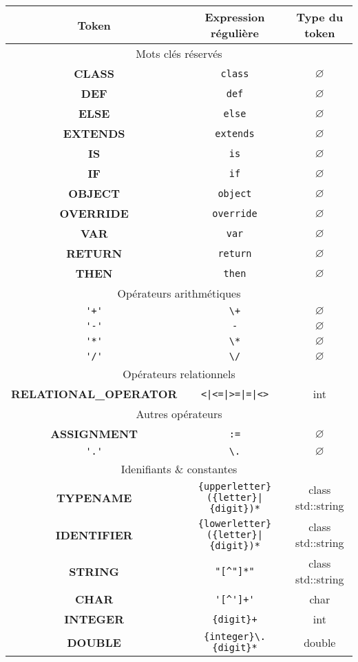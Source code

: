\documentclass[12pt,a4paper]{article}
\begin{document}
\begin{center}
	\sffamily
	\begin{tabular}{|c|c|c|}
		\hline
		Token & Expression régulière & Type du token \tabularnewline
		\hline \hline
		\multicolumn{3}{|c|}{Mots clés réservés} \tabularnewline		
		\hline
		\textbf{CLASS}    & \verb|class|    & $\varnothing$ \tabularnewline
		\hline
		\textbf{DEF}      & \verb|def|      & $\varnothing$ \tabularnewline
		\hline
		\textbf{ELSE}     &  \verb|else|    & $\varnothing$ \tabularnewline
		\hline
		\textbf{EXTENDS}  & \verb|extends|  & $\varnothing$ \tabularnewline
		\hline
		\textbf{IS}       & \verb|is|       & $\varnothing$ \tabularnewline
		\hline
		\textbf{IF}       & \verb|if|       & $\varnothing$ \tabularnewline
		\hline
		\textbf{OBJECT}   & \verb|object|   & $\varnothing$ \tabularnewline
		\hline
		\textbf{OVERRIDE} & \verb|override| & $\varnothing$ \tabularnewline
		\hline
		\textbf{VAR}      & \verb|var|      & $\varnothing$ \tabularnewline
		\hline
		\textbf{RETURN}   & \verb|return|   & $\varnothing$ \tabularnewline
		\hline
		\textbf{THEN}     & \verb|then|     & $\varnothing$ \tabularnewline
		\hline \hline
		\multicolumn{3}{|c|}{Opérateurs arithmétiques} \tabularnewline
		\hline
		\verb|'+'| & \verb|\+| & $\varnothing$ \tabularnewline
		\verb|'-'| & \verb|-|  & $\varnothing$ \tabularnewline
		\verb|'*'| & \verb|\*| & $\varnothing$ \tabularnewline
		\verb|'/'| & \verb|\/| & $\varnothing$ \tabularnewline
		\hline \hline
		\multicolumn{3}{|c|}{Opérateurs relationnels} \tabularnewline
		\hline
		\textbf{RELATIONAL\_OPERATOR} & \verb!<|<=|>=|=|<>! & {\color{blue}int} \tabularnewline
		\hline \hline
		\multicolumn{3}{|c|}{Autres opérateurs} \tabularnewline
		\hline
		\textbf{ASSIGNMENT}     & \verb|:=| & $\varnothing$ \tabularnewline
		\verb|'.'| & \verb|\.|  & $\varnothing$ \tabularnewline
		\hline \hline
		\multicolumn{3}{|c|}{Idenifiants \& constantes} \tabularnewline
		\hline
		\textbf{TYPENAME} & \verb/{upperletter}({letter}|{digit})*/ & {\color{blue}class} {\color{turquoise}std}::{\color{turquoise}string} \tabularnewline
		\textbf{IDENTIFIER} & \verb/{lowerletter}({letter}|{digit})*/ & {\color{blue}class} {\color{turquoise}std}::{\color{turquoise}string} \tabularnewline
		\textbf{STRING}     & \verb|"[^"]*"|                     & {\color{blue}class} {\color{turquoise}std}::{\color{turquoise}string} \tabularnewline
		\textbf{CHAR}       & \verb|'[^']+'|             & {\color{blue}char}   \tabularnewline		
		\textbf{INTEGER}    & \verb|{digit}+|            & {\color{blue}int}    \tabularnewline
		\textbf{DOUBLE}     & \verb|{integer}\.{digit}*| & {\color{blue}double} \tabularnewline
		\hline
	\end{tabular}
\end{center}
\end{document}
